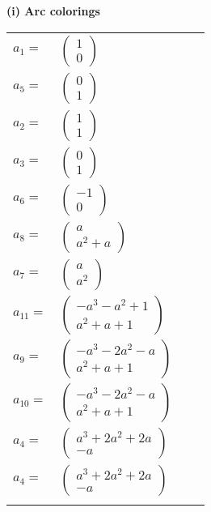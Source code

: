 \documentclass[1p]{elsarticle_modified}
\theoremstyle{definition}
\begin{document}
\flushleft \textbf{(i) Arc colorings}\\
\begin{tabular}{m{7pt} m{180pt} m{7pt} m{180pt} }
\flushright $a_{1}=$&$\begin{pmatrix}1\\0\end{pmatrix}$ \\
\flushright $a_{5}=$&$\begin{pmatrix}0\\1\end{pmatrix}$ \\
\flushright $a_{2}=$&$\begin{pmatrix}1\\1\end{pmatrix}$ \\
\flushright $a_{3}=$&$\begin{pmatrix}0\\1\end{pmatrix}$ \\
\flushright $a_{6}=$&$\begin{pmatrix}-1\\0\end{pmatrix}$ \\
\flushright $a_{8}=$&$\begin{pmatrix}a\\a^2+a\end{pmatrix}$ \\
\flushright $a_{7}=$&$\begin{pmatrix}a\\a^2\end{pmatrix}$ \\
\flushright $a_{11}=$&$\begin{pmatrix}- a^3- a^2+1\\a^2+a+1\end{pmatrix}$ \\
\flushright $a_{9}=$&$\begin{pmatrix}- a^3-2 a^2- a\\a^2+a+1\end{pmatrix}$ \\
\flushright $a_{10}=$&$\begin{pmatrix}- a^3-2 a^2- a\\a^2+a+1\end{pmatrix}$ \\
\flushright $a_{4}=$&$\begin{pmatrix}a^3+2 a^2+2 a\\- a\end{pmatrix}$\\ \flushright $a_{4}=$&$\begin{pmatrix}a^3+2 a^2+2 a\\- a\end{pmatrix}$\\&\end{tabular}
\end{document}
